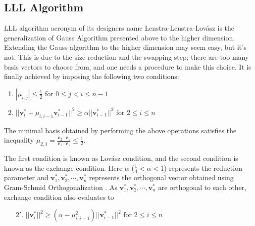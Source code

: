 \subsection{LLL Algorithm}
LLL algorithm acronym of its designers name Lenstra-Lenstra-Lov\'{a}sz \cite{lenstra1982factoring} is the generalization of Gauss Algorithm\cite{bremner2011lattice} presented above to the higher dimension.
Extending the Gauss algorithm to the higher dimension may seem easy, but it's not.
This is due to the size-reduction and the swapping step; there are too many basis vectors to choose from, and one needs a procedure to make this choice.
It is finally achieved by imposing the following two conditions:
\begin{enumerate}
    \item $|\mu_{i,j}|\leq \frac{1}{2}$  \hspace{11.2em} for $0 \leq j < i \leq n-1$
    \item $||\pmb{v}_i^* + \mu_{i,i-1}\pmb{v}_{i-1}^*||^2 \geq \alpha ||\pmb{v}_{i-1}^*||^2$ \hspace{1.8em} for $2\leq i \leq n$
\end{enumerate}

The minimal basis obtained by performing the above operations satisfies the inequality $ \mu_{2,1}=\frac{\pmb{v}_2 \cdot \pmb{v}_1}{\pmb{v}_1 \cdot \pmb{v}_1}\leq \frac{1}{2}$.



The first condition is known as Lov\'asz condition, and the second condition is known as the exchange condition.
Here $\alpha$ ($\frac{1}{4}<\alpha<1 $) represents the reduction parameter and $\pmb{v}^*_1,\pmb{v}^*_2,\cdots,\pmb{v}^*_n$ represents the orthogonal vector obtained using Gram-Schmid Orthogonalization \cite{lang2012introduction}.
As $\pmb{v}^*_1,\pmb{v}^*_2,\cdots,\pmb{v}^*_n$ are orthogonal to each other, exchange condition also evaluates to
\begin{enumerate}
    \item[$2'.$] $||\pmb{v}_i^*||^2 \geq (\alpha-\mu_{i,i-1}^2) ||\pmb{v}_{i-1}^*||^2$ \hspace{1.8em} for $2\leq i \leq n$
\end{enumerate}

